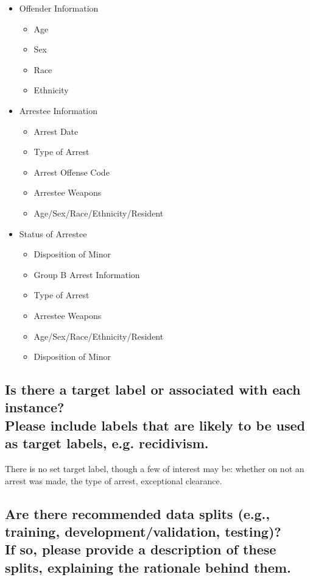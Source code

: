 \documentclass[letterpaper, 10 pt, conference]{ieeeconf}  %
\newcommand{\subtitle}[1]{{\\ \small \normalfont \color{purple} #1}}
\begin{document}
\begin{itemize}
\begin{itemize}
    \end{itemize}
    \item Offender Information
    \begin{itemize}
        \item Age
        \item Sex
        \item Race
        \item Ethnicity
    \end{itemize}
    \item Arrestee Information
    \begin{itemize}
        \item Arrest Date
        \item Type of Arrest
        \item Arrest Offense Code
        \item Arrestee Weapons
        \item Age/Sex/Race/Ethnicity/Resident
    \end{itemize}
    \item Status of Arrestee
    \begin{itemize}
        \item Disposition of Minor
        \item Group B Arrest Information
        \item Type of Arrest
        \item Arrestee Weapons
        \item Age/Sex/Race/Ethnicity/Resident
        \item Disposition of Minor
    \end{itemize}
\end{itemize}


\subsection{Is there a target label or associated with each instance? \subtitle{Please include labels that are likely to be used as target labels, e.g. recidivism.}}

There is no set target label, though a few of interest may be: whether on not an arrest was made, the type of arrest, exceptional clearance. 

\subsection{Are there recommended data splits (e.g., training, development/validation, testing)? \subtitle{If so, please provide a description of these splits, explaining the rationale behind them.}}
\end{document}
